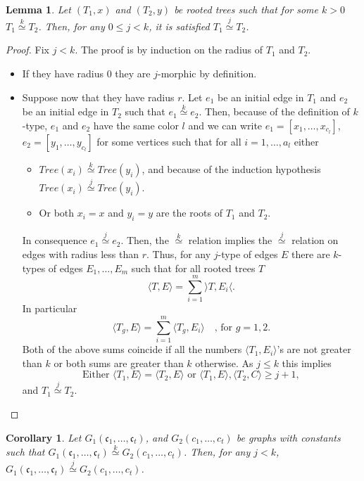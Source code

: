 \documentclass[11pt,notitlepage]{report}
\newtheorem{lemma}{Lemma}[chapter]
\newtheorem{corollary}{Corollary}[chapter]
\theoremstyle{definition}
\newcommand{\cc}{\mathfrak{c}}
\newcommand{\morph}[1]{\stackrel{#1}{\simeq}}
\begin{document}
\begin{lemma} \label{lem:lessktree}
	Let $(T_1,x)$ and $(T_2,y)$ be rooted trees such that for some $k>0$ 
	$T_1 \morph{k} T_2$. Then, for any $0\leq j < k$, it is satisfied
	$T_1 \morph{j} T_2$.
\end{lemma}
\begin{proof}
	Fix $j<k$. The proof is by induction on the radius of $T_1$ and $T_2$.
	\begin{itemize}[leftmargin=*]
		\item If they have radius $0$ they are $j$-morphic by definition. 
		\item Suppose now that they have radius $r$. Let $e_1$ be an initial edge 
		in $T_1$ and $e_2$ be an initial edge in $T_2$ such that $e_1 \morph{k} e_2$.
		Then, because of the definition of $k$-type,
		$e_1$ and $e_2$ have the same color $l$ and we can write
		$e_1=[x_1,\dots,x_{c_l}]$,
		$e_2=[y_1,\dots,y_{c_l}]$ for some vertices such that for all
		$i=1,\dots, a_l$ either 
		\begin{itemize}
			\item $Tree(x_i)\morph{k} Tree(y_i)$, and because of the induction hypothesis $Tree(x_i)\morph{j} Tree(y_i)$. 
			\item Or both $x_i=x$ and $y_i=y$ are the roots of $T_1$ and $T_2$.
		\end{itemize}
		In consequence $e_1\morph{j} e_2$. Then, the $\morph{k}$ relation
		implies the $\morph{j}$ relation on edges with radius less than $r$.
		Thus, for any $j$-type of edges $E$ there are 
		$k$-types of edges $E_1, \dots, E_m$ such that for all rooted trees $T$
		\[ \langle T,E\rangle = \sum_{i=1}^{m} \rangle T,E_i \langle .\]
		In particular
		\[\langle T_g , E\rangle =\sum_{i=1}^m \langle T_g, E_i \rangle 
		\quad \text{, for } 	g=1,2.\]	
	 	Both of the above sums coincide if all the numbers
	 	$\langle T_1, E_i\rangle$'s are not greater than $k$ or
	 	both sums are greater than $k$ otherwise. As $j\leq k$ this implies
	 	\[\text{Either }\langle T_1, E \rangle =\langle T_2,E \rangle \text{ or } \langle T_1,E \rangle ,\langle T_2,C \rangle \geq j+1 ,\]
	 	and $T_1\morph{j}T_2$. 		
	\end{itemize}
\end{proof}	


\begin{corollary}
	Let $G_1(\cc_1,\dots, \cc_t)$, and $G_2(c_1,\dots,c_t)$ be graphs
	with constants such that $G_1(\cc_1,\dots, \cc_t)\morph{k}G_2(c_1,\dots,c_t)$.
	Then, for any $j<k$, $G_1(\cc_1,\dots, \cc_t)\morph{j}G_2(c_1,\dots,c_t)$.
\end{corollary}
\end{document}

